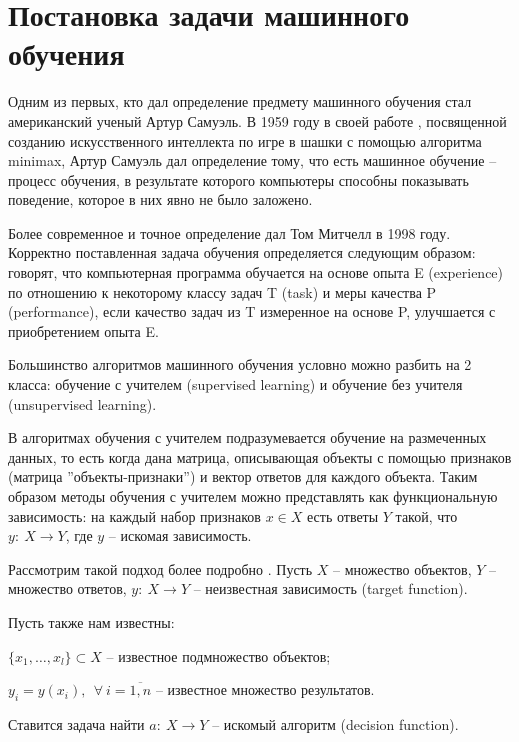 \section{Постановка задачи машинного обучения}

Одним из первых, кто дал определение предмету машинного обучения стал американский ученый Артур Самуэль. В 1959 году в своей работе \cite{Samuel:ML}, посвященной созданию искусственного интеллекта по игре в шашки с помощью алгоритма minimax, Артур Самуэль дал определение тому, что есть машинное обучение -- процесс обучения, в результате которого компьютеры способны показывать поведение, которое в них явно не было заложено.

Более современное и точное определение дал Том Митчелл в 1998 году. Корректно поставленная задача обучения определяется следующим образом: говорят, что компьютерная программа обучается на основе опыта E (experience) по отношению к некоторому классу задач T (task) и меры качества P (performance), если качество задач из T измеренное на основе P, улучшается с приобретением опыта E.

Большинство алгоритмов машинного обучения условно можно разбить на 2 класса: обучение с учителем (supervised learning) и обучение без учителя (unsupervised learning).

В алгоритмах обучения с учителем подразумевается обучение на размеченных данных, то есть когда дана матрица, описывающая объекты с помощью признаков (матрица ''объекты-признаки'') и вектор ответов для каждого объекта. Таким образом методы обучения с учителем можно представлять как функциональную зависимость: на каждый набор признаков $x \in X$ есть ответы $Y$ такой, что $y:~X \rightarrow Y$, где $y$ -- искомая зависимость.

Рассмотрим такой подход более подробно \cite{coursera:voroncov}. Пусть $X$ -- множество объектов, $Y$ -- множество ответов, $y:~X \rightarrow Y$ -- неизвестная зависимость (target function).

Пусть также нам известны:\\
\begin{description}[font=$\bullet$]
    \item $\{ x_1, \dots, x_l \} \subset X $ -- известное подмножество объектов;\\
    \item $y_i = y(x_i),~~\forall~i=\overline{1,n}$ -- известное множество результатов.\\
\end{description}
Ставится задача найти $a:~X \rightarrow Y$ -- искомый алгоритм (decision function).


